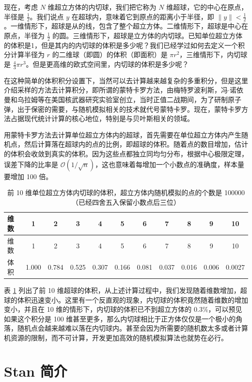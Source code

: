 \documentclass[12pt,a4paper,UTF8,twoside]{book}
\theoremstyle{definition}
\theoremstyle{definition}
\theoremstyle{definition}
\theoremstyle{remark}
\begin{document}
现在，考虑 \(N\) 维超立方体的内切球，我们把它称为 \(N\)
维超球，它的中心在原点，半径是 \(\frac{1}{2}\)。我们说点 \(y\)
在超球内，意味着它到原点的距离小于半径，即
\(\| y \| < \frac{1}{2}\)。一维情形下，超球是从的线，包含了整个超立方体。二维情形下，超球是中心在原点，半径为
\(\frac{1}{2}\)
的圆。三维情形下，超球是立方体的内切球。已知单位超立方体的体积是1，但是其内的内切球的体积是多少呢？我们已经学过如何去定义一个积分计算半径为
\(r\) 的二维球（即圆）的体积（即面积）是
\(\pi r^2\)，三维情形下，内切球是
\(\frac{4}{3}\pi r^3\)。但是更高维的欧式空间里，内切球的体积是多少呢？

在这种简单的体积积分设置下，当然可以去计算越来越复杂的多重积分，但是这里介绍采样的方法去计算积分，即所谓的蒙特卡罗方法，由梅特罗波利斯，冯\(\cdot\)诺依曼和乌拉姆等在美国核武器研究实验室创立，当时正值二战期间，为了研制原子弹，出于保密的需要，与随机模拟相关的技术就代号蒙特卡罗。现在，蒙特卡罗方法占据现代统计计算的核心地位，特别是与贝叶斯相关的领域。

用蒙特卡罗方法去计算单位超立方体内的超球，首先需要在单位超立方体内产生随机点，然后计算落在超球内的点的比例，即超球的体积。随着点的数目增加，估计的体积会收敛到真实的体积。因为这些点都独立同均匀分布，根据中心极限定理，误差下降的比率是
\(\mathcal{O}\left( 1 / \sqrt{n} \right)\)，这也意味着每增加一个小数点的准确度，样本量要增加
100 倍。

\begin{longtable}[]{@{}lcccccccccc@{}}
\caption{\label{tab:calculate-volume-of-hyperball} 前 10
维单位超立方体内切球的体积，超立方体内随机模拟的点的个数是
100000（已经四舍五入保留小数点后三位）}\tabularnewline
\toprule
维数 & 1 & 2 & 3 & 4 & 5 & 6 & 7 & 8 & 9 & 10\tabularnewline
\midrule
\endfirsthead
\toprule
维数 & 1 & 2 & 3 & 4 & 5 & 6 & 7 & 8 & 9 & 10\tabularnewline
\midrule
\endhead
体积 & 1.000 & 0.784 & 0.525 & 0.307 & 0.166 & 0.081 & 0.037 & 0.016 &
0.006 & 0.0027\tabularnewline
\bottomrule
\end{longtable}

表 \ref{tab:calculate-volume-of-hyperball} 列出了前 10
维超球的体积，从上述计算过程中，我们发现随着维数增加，超球的体积迅速变小。这里有一个反直观的现象，内切球的体积竟然随着维数的增加变小，并且在
10 维的情形下，内切球的体积已不到超立方体的
0.3\%，可以预见如果这个积分是 100
维甚至更多，那么内切球相比于正方体仅仅是一个极小的角落，随机点会越来越难以落在内切球内。甚至会因为所需要的随机数太多或者计算机资源的限制，而不可计算，开发更加高效的随机模拟算法也就势在必行。

\hypertarget{sec:stan-samplers}{%
\section{Stan 简介}\label{sec:stan-samplers}}
\end{document}
